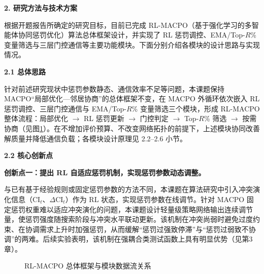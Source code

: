 \par
\indent

\noindent\textbf{2. 研究方法与技术方案}

\par
\indent
根据开题报告所确定的研究目标，目前已完成 RL-MACPO（基于强化学习的多智能体协同惩罚优化）算法总体框架设计，并实现了 RL 惩罚调控、EMA/Top-$R$\% 变量筛选与三层门控通信等主要功能模块。下面分别介绍各模块的设计思路与实现情况。

\par
\indent
\textbf{2.1 总体思路}
\par
针对前述研究现状中惩罚参数静态、通信效率不足等问题，本课题保持 MACPO“局部优化—邻居协商”的总体框架不变，在 MACPO 外循环依次嵌入 RL 惩罚调控、三层门控通信与 EMA/Top-$R$\% 变量筛选三个模块，形成 RL-MACPO 整体流程：局部优化 $\rightarrow$ RL 惩罚更新 $\rightarrow$ 门控判定 $\rightarrow$ Top-$R$\% 筛选 $\rightarrow$ 按需协商（见图\ref{fig:framework}）。在不增加评价预算、不改变网络拓扑的前提下，上述模块协同改善解质量并降低通信负载；各模块设计原理见 2.2--2.6 小节。



\par
\indent
\textbf{2.2 核心创新点}
\par
\indent
\textbf{创新点一：提出 RL 自适应惩罚机制，实现惩罚参数动态调整。}
\par
与已有基于经验规则或固定惩罚参数的方法不同，本课题在算法研究中引入冲突演化信息（$\mathrm{CI}_t$、$\Delta\mathrm{CI}_t$）作为 RL 状态，实现惩罚参数在线调节。针对 MACPO 固定惩罚权重难以适应冲突演化的问题，本课题设计轻量级策略网络输出连续调节量，使惩罚强度随搜索阶段与冲突水平联动更新。该机制在冲突尚弱时避免过度约束、在协调需求上升时加强惩罚，从而缓解“惩罚过强致停滞”与“惩罚过弱致不协调”的两难。后续实验表明，该机制在强耦合类测试函数上具有明显优势（见第3章）。


\begin{figure}[htbp]
\centering
\usetikzlibrary{positioning,arrows.meta}
\caption{RL-MACPO 总体框架与模块数据流关系}
\label{fig:framework}
\end{figure}

